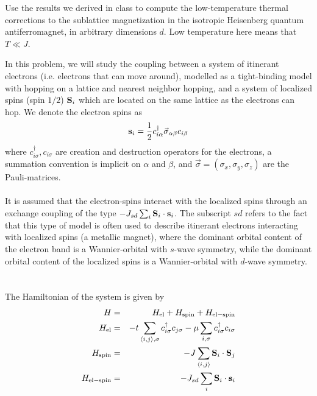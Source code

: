 
\begin{problem}
Use the results we derived in class to compute the low-temperature thermal corrections to the sublattice magnetization in the isotropic Heisenberg quantum antiferromagnet, in arbitrary dimensions $d$. Low temperature here means that $T \ll J$.   
\end{problem}
\begin{problem}
	
In this problem, we will study the coupling between a system of itinerant electrons (i.e. electrons that can move around), modelled as a tight-binding model with hopping on a lattice and nearest neighbor hopping, and a system of localized spins (spin $1/2$) ${\bf S}_i$ which are located on the same lattice as the electrons can hop. We denote the electron spins as 
\begin{eqnarray}
	{\bf s}_i = \frac{1}{2} c^{\dagger}_{i \alpha} {\vec  \sigma}_{\alpha \beta} c_{i \beta} \nonumber
\end{eqnarray}
where $c^{\dagger}_{i \sigma}, c_{i \sigma}$ are creation and destruction operators for the electrons, a summation convention is implicit on $\alpha$ and $\beta$, and $\vec \sigma = (\sigma_x,\sigma_y,\sigma_z)$ are the Pauli-matrices. 
\ \\
\ \\
It is assumed that  the electron-spins interact with the localized spins through an exchange coupling of the type 
$-J_{sd}  \sum_i {\bf S}_i \cdot {\bf s}_i$. The subscript $sd$ refers to the fact that this type of model is often used to describe itinerant electrons interacting with localized spins (a metallic magnet), where the dominant orbital content of the electron band is a Wannier-orbital with $s$-wave symmetry, while the dominant orbital content of the localized spins is a Wannier-orbital with  $d$-wave symmetry.  
\ \\
\ \\
The Hamiltonian of the system is given by 
\begin{eqnarray}
	H & = & H_{\rm{el}} + H_{\rm{spin}} + H_{\rm{el-spin}} \nonumber \\ 
	H_{\rm{el}} & = & - t \sum_{\langle i,j \rangle, \sigma } c^{\dagger}_{i \sigma}c_{j \sigma} - \mu \sum_{i,\sigma} c^{\dagger}_{i \sigma}c_{i \sigma} \nonumber \\
	H_{\rm{spin}} & = & -J \sum_{\langle i,j \rangle } {\bf S}_i \cdot {\bf S}_j \nonumber \\ 
	H_{\rm{el-spin}} & = & - J_{sd} \sum_i {\bf S}_i \cdot {\bf s}_i \nonumber 

\end{eqnarray}
\end{problem}
